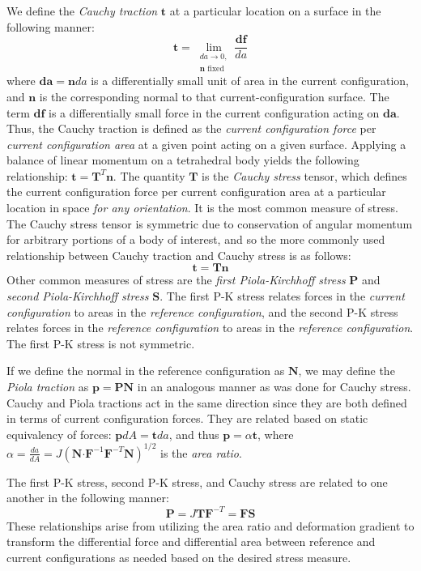 We define the \textit{Cauchy traction} $\bm{t}$ at a particular location on a surface in the following manner:
\begin{equation}
\bm{t} = \lim_{\substack{{da} \rightarrow 0, \\ {\bm{n} \text{\ fixed}}}} \frac{{\bm{df}}}{da}
\end{equation}
where $\bm{da} = \bm{n}da$ is a differentially small unit of area in the current configuration, and $\bm{n}$ is the corresponding normal to that current-configuration surface. The term $\bm{df}$ is a differentially small force in the current configuration acting on $\bm{da}$. Thus, the Cauchy traction is defined as the \textit{current configuration force} per \textit{current configuration area} at a given point acting on a given surface. Applying a balance of linear momentum on a tetrahedral body yields the following relationship: $\bm{t} = \bm{T}^T\bm{n}$. The quantity $\bm{T}$ is the \textit{Cauchy stress} tensor, which defines the current configuration force per current configuration area at a particular location in space \textit{for any orientation}. It is the most common measure of stress. The Cauchy stress tensor is symmetric due to conservation of angular momentum for arbitrary portions of a body of interest, and so the more commonly used relationship between Cauchy traction and Cauchy stress is as follows:
\begin{equation}
\bm{t} = \bm{T}\bm{n}
\end{equation}
Other common measures of stress are the \textit{first Piola-Kirchhoff stress} $\bm{P}$ and \textit{second Piola-Kirchhoff stress} $\bm{S}$. The first P-K stress relates forces in the \textit{current configuration} to areas in the \textit{reference configuration}, and the second P-K stress relates forces in the \textit{reference configuration} to areas in the \textit{reference configuration}. The first P-K stress is not symmetric.

If we define the normal in the reference configuration as $\bm{N}$, we may define the \textit{Piola traction} as $\bm{p} = \bm{P}\bm{N}$ in an analogous manner as was done for Cauchy stress. Cauchy and Piola tractions act in the same direction since they are both defined in terms of current configuration forces. They are related based on static equivalency of forces: $\bm{p}dA = \bm{t}da$, and thus $\bm{p} = \alpha\bm{t}$, where $\alpha = \frac{da}{dA} = J\left(\bm{N} \bm{\cdot} \bm{F}^{-1}\bm{F}^{-T}\bm{N}\right)^{1/2}$ is the \textit{area ratio}.

The first P-K stress, second P-K stress, and Cauchy stress are related to one another in the following manner:
\begin{equation}
\bm{P} = J\bm{T}\bm{F}^{-T} = \bm{F}\bm{S}
\end{equation}
These relationships arise from utilizing the area ratio and deformation gradient to transform the differential force and differential area between reference and current configurations as needed based on the desired stress measure.

